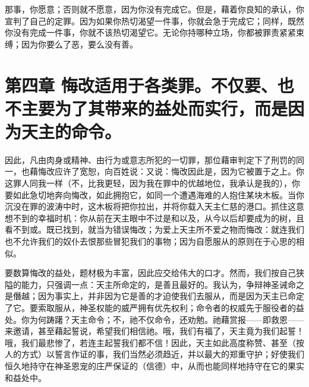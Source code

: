 那事，你愿意；否则就不愿意，因为你没有完成它。但是，藉着你良知的承认，你宣判了自己的定罪。因为如果你热切渴望一件事，你就会急于完成它；同样，既然你没有完成一件事，你就不该热切渴望它。无论你持哪种立场，你都被罪责紧紧束缚；因为你要么了恶，要么没有善。\par


\section{第四章 悔改适用于各类罪。不仅要、也不主要为了其带来的益处而实行，而是因为天主的命令。}

因此，凡由肉身或精神、由行为或意志所犯的一切罪，那位藉审判定下了刑罚的同一，也藉悔改应许了宽恕，向百姓说：又说：悔改因此是，因为它被置于之上。你这罪人同我一样（不，比我更轻，因为我在罪中的优越地位，我承认是我的），你要如此急切地奔向悔改，如此拥抱它，如同一个遭遇海难的人抱住某块木板。当你沉没在罪的波涛中时，这木板将把你拉出，并将你载入天主仁慈的港口。抓住这意想不到的幸福时机：你从前在天主眼中不过是和以及，从今以后却要成为的树，且看不到或。既已找到，就当为错误悔改；为爱上天主所不爱之物而悔改：就连我们也不允许我们的奴仆去恨那些冒犯我们的事物；因为自愿服从的原则在于心思的相似。\par

要数算悔改的益处，题材极为丰富，因此应交给伟大的口才。然而，我们按自己狭隘的能力，只强调一点：天主所命定的，是善且最好的。我认为，争辩神圣诫命之是僭越；因为事实上，并非因为它是善的才迫使我们去服从，而是因为天主已命定了它。要索取服从，神圣权能的威严拥有优先权利；命令者的权威先于服役者的益处。你为何踌躇？天主命令；不，祂不仅命令，还劝勉。祂藉赏报——即救恩——来邀请，甚至藉起誓说，希望我们相信祂。哦，我们有福了，天主竟为我们起誓！哦，我们最悲惨了，若连主起誓我们都不信！因此，天主如此高度称赞、甚至（按人的方式）以誓言作证的事，我们当然必须趋近，并以最大的郑重守护；好使我们恒久地持守在神圣恩宠的庄严保证的（信德）中，从而也能同样地持守在它的果实和益处中。\par

